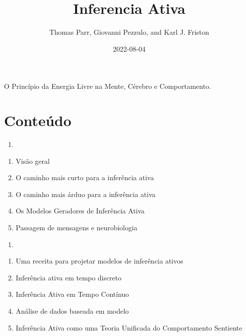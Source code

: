 \documentclass[
  12pt,
]{book}
\title{Inferencia Ativa}
\author{Thomas Parr, Giovanni Pezzulo, and Karl J. Friston}
\date{2022-08-04}
\providecommand{\tightlist}{%
  \setlength{\itemsep}{0pt}\setlength{\parskip}{0pt}}
\begin{document}
\maketitle

{
\hypersetup{linkcolor=}
\setcounter{tocdepth}{1}
\tableofcontents
}
\listoffigures
\listoftables
O Princípio da Energia Livre na Mente, Cérebro e Comportamento.

\hypertarget{conteuxfado}{%
\chapter*{Conteúdo}\label{conteuxfado}}

\begin{enumerate}
\def\labelenumi{(\Roman{enumi})}
\tightlist
\item
\end{enumerate}

\begin{enumerate}
\def\labelenumi{\arabic{enumi}.}
\tightlist
\item
  Visão geral\\
\item
  O caminho mais curto para a inferência ativa\\
\item
  O caminho mais árduo para a inferência ativa\\
\item
  Os Modelos Geradores de Inferência Ativa\\
\item
  Passagem de mensagens e neurobiologia
\end{enumerate}

\begin{enumerate}
\def\labelenumi{(\Roman{enumi})}
\setcounter{enumi}{1}
\tightlist
\item
\end{enumerate}

\begin{enumerate}
\def\labelenumi{\arabic{enumi}.}
\setcounter{enumi}{5}
\tightlist
\item
  Uma receita para projetar modelos de inferência ativos
\item
  Inferência ativa em tempo discreto
\item
  Inferência Ativa em Tempo Contínuo
\item
  Análise de dados baseada em modelo
\item
  Inferência Ativa como uma Teoria Unificada do Comportamento Sentiente
\end{enumerate}
\end{document}
